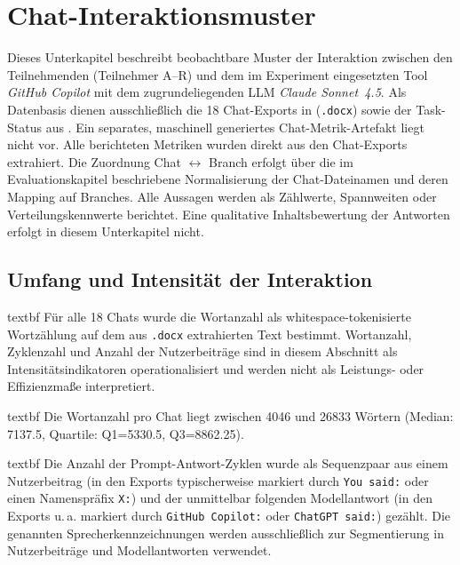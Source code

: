 \section{Chat-Interaktionsmuster}
\label{sec:results_chat}

Dieses Unterkapitel beschreibt beobachtbare Muster der Interaktion zwischen den Teilnehmenden (Teilnehmer A--R) und dem im Experiment eingesetzten Tool \emph{GitHub Copilot} mit dem zugrundeliegenden LLM \emph{Claude Sonnet~4.5}.
Als Datenbasis dienen ausschließlich die 18 Chat-Exports in  (\texttt{.docx}) sowie der Task-Status aus .
Ein separates, maschinell generiertes Chat-Metrik-Artefakt liegt nicht vor. Alle berichteten Metriken wurden direkt aus den Chat-Exports extrahiert.
Die Zuordnung Chat $\leftrightarrow$ Branch erfolgt über die im Evaluationskapitel beschriebene Normalisierung der Chat-Dateinamen und deren Mapping auf Branches.
Alle Aussagen werden als Zählwerte, Spannweiten oder Verteilungskennwerte berichtet. Eine qualitative Inhaltsbewertung der Antworten erfolgt in diesem Unterkapitel nicht.

\subsection{Umfang und Intensität der Interaktion}
\label{sec:results_chat_volume}

	\csname textbf Für alle 18 Chats wurde die Wortanzahl als whitespace-tokenisierte Wortzählung auf dem aus \texttt{.docx} extrahierten Text bestimmt. Wortanzahl, Zyklenzahl und Anzahl der Nutzerbeiträge sind in diesem Abschnitt als Intensitätsindikatoren operationalisiert und werden nicht als Leistungs- oder Effizienzmaße interpretiert.

	\csname textbf Die Wortanzahl pro Chat liegt zwischen 4046 und 26833 Wörtern (Median: 7137.5, Quartile: Q1=5330.5, Q3=8862.25).

	\csname textbf Die Anzahl der Prompt-Antwort-Zyklen wurde als Sequenzpaar aus einem Nutzerbeitrag (in den Exports typischerweise markiert durch \texttt{You said:} oder einen Namenspräfix \texttt{X:}) und der unmittelbar folgenden Modellantwort (in den Exports u.\,a. markiert durch \texttt{GitHub Copilot:} oder \texttt{ChatGPT said:}) gezählt. Die genannten Sprecherkennzeichnungen werden ausschließlich zur Segmentierung in Nutzerbeiträge und Modellantworten verwendet.

